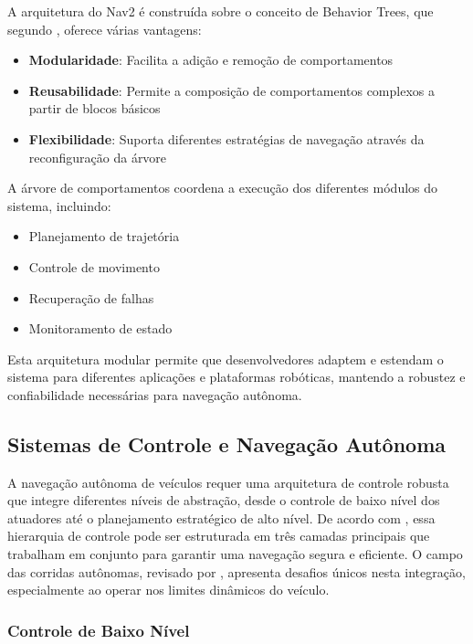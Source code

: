 A arquitetura do Nav2 é construída sobre o conceito de Behavior Trees, que
segundo \cite{Ivanov2020Verifying}, oferece várias vantagens:

\begin{itemize}
    \item \textbf{Modularidade}: Facilita a adição e remoção de comportamentos
    \item \textbf{Reusabilidade}: Permite a composição de comportamentos complexos a partir de blocos básicos
    \item \textbf{Flexibilidade}: Suporta diferentes estratégias de navegação através da reconfiguração da árvore
\end{itemize}

A árvore de comportamentos coordena a execução dos diferentes módulos do
sistema, incluindo:
\begin{itemize}
    \item Planejamento de trajetória
    \item Controle de movimento
    \item Recuperação de falhas
    \item Monitoramento de estado
\end{itemize}

Esta arquitetura modular permite que desenvolvedores adaptem e estendam o
sistema para diferentes aplicações e plataformas robóticas, mantendo a robustez
e confiabilidade necessárias para navegação autônoma.

\subsection{Sistemas de Controle e Navegação Autônoma}

A navegação autônoma de veículos requer uma arquitetura de controle robusta que
integre diferentes níveis de abstração, desde o controle de baixo nível dos
atuadores até o planejamento estratégico de alto nível. De acordo com
\cite{Wang2020LMPC}, essa hierarquia de controle pode ser estruturada em três
camadas principais que trabalham em conjunto para garantir uma navegação segura
e eficiente. O campo das corridas autônomas, revisado por
\cite{Betz2022Survey}, apresenta desafios únicos nesta integração,
especialmente ao operar nos limites dinâmicos do veículo.

\subsubsection{Controle de Baixo Nível}

